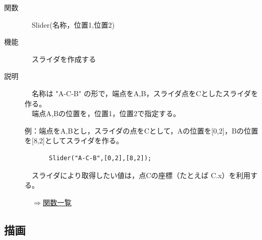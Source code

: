 \documentclass[papersize,a4paper,12pt,uplatex]{jsarticle}
\begin{document}
\begin{description}
\hypertarget{slider}{}
\item[関数]　Slider(名称，位置1,位置2)
\item[機能]　スライダを作成する
\item[説明]　名称は "A-C-B" の形で，端点をA,B，スライダ点をCとしたスライダを作る。\\
　端点A,Bの位置を，位置1，位置2で指定する。

例：端点をA,Bとし，スライダの点をCとして，Aの位置を[0,2]，Bの位置を[8,2]としてスライダを作る。
\begin{verbatim}
　　　　Slider("A-C-B",[0,2],[8,2]);
\end{verbatim}
　スライダにより取得したい値は，点Cの座標（たとえば C.x）を利用する。
　\\
\begin{flushright}　\hyperlink{functionlist}{$\Rightarrow$関数一覧}\end{flushright}
\end{description}

\newpage
\subsection{描画}
\end{document}

